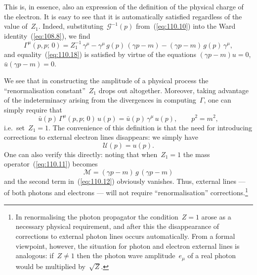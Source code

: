 This is, in essence, also an expression of the definition of the physical charge of the electron. It is easy to see that it is automatically satisfied regardless of the value of~$Z_1$. Indeed, substituting~$\mathcal{G}^{-1}(p)$ from~(\ref{eq:110.10}) into the Ward identity~(\ref{eq:108.8}), we find
\[
\Gamma^\mu(p,p;\,0) = Z_1^{-1}\,\gamma^\mu - \gamma^\mu\,g(p)\,(\gamma p - m) - (\gamma p - m)\,g(p)\,\gamma^\mu,
\]
and equality~(\ref{eq:110.18}) is satisfied by virtue of the equations $(\gamma p - m)u = 0$, $\bar{u}(\gamma p - m) = 0$.

We see that in constructing the amplitude of a physical process the ``renormalisation constant''~$Z_1$ drops out altogether. Moreover, taking advantage of the indeterminacy arising from the divergences in computing~$\Gamma$, one can simply require that
\begin{equation}
\bar{u}(p)\,\Gamma^\mu(p,p;\,0)\,u(p) = \bar{u}(p)\,\gamma^\mu\,u(p), \qquad p^2 = m^2,
\label{eq:110.19}
\end{equation}
i.e.\ set~$Z_1 = 1$. The convenience of this definition is that the need for introducing corrections to external electron lines disappears: we simply have
\[
\mathcal{U}(p) = u(p).
\]
One can also verify this directly: noting that when~$Z_1 = 1$ the mass operator~(\ref{eq:110.11}) becomes
\begin{equation}
\mathcal{M} = (\gamma p - m)\,g\,(\gamma p - m)
\label{eq:110.20}
\end{equation}
and the second term in~(\ref{eq:110.12}) obviously vanishes. Thus, external lines --- of both photons and electrons --- will not require ``renormalisation'' corrections.\footnote{In renormalising the photon propagator the condition~$Z = 1$ arose as a necessary physical requirement, and after this the disappearance of corrections to external photon lines occurs automatically. From a formal viewpoint, however, the situation for photon and electron external lines is analogous: if~$Z \neq 1$ then the photon wave amplitude~$e_\mu$ of a real photon would be multiplied by~$\sqrt{Z}$.}
